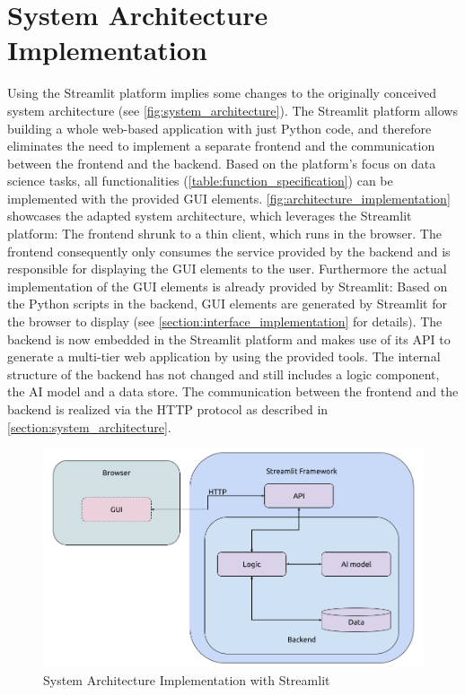 \documentclass[11pt,a4paper,english]{scrreprt}
\begin{document}
\section{System Architecture Implementation}
Using the Streamlit platform implies some changes to the originally conceived system architecture (see \autoref{fig:system_architecture}). The Streamlit platform allows building a whole web-based application with just Python code, and therefore eliminates the need to implement a separate frontend and the communication between the frontend and the backend. Based on the platform's focus on data science tasks, all functionalities (\autoref{table:function_specification}) can be implemented with the provided GUI elements. \autoref{fig:architecture_implementation} showcases the adapted system architecture, which leverages the Streamlit platform: The frontend shrunk to a thin client, which runs in the browser. The frontend consequently only consumes the service provided by the backend and is responsible for displaying the GUI elements to the user. Furthermore the actual implementation of the GUI elements is already provided by Streamlit: Based on the Python scripts in the backend, GUI elements are generated by Streamlit for the browser to display (see \autoref{section:interface_implementation} for details). The backend is now embedded in the Streamlit platform and makes use of its API to generate a multi-tier web application by using the provided tools. The internal structure of the backend has not changed and still includes a logic component, the AI model and a data store. The communication between the frontend and the backend is realized via the HTTP protocol as described in \autoref{section:system_architecture}.

\begin{figure}[htbp]
    \centering
    \includegraphics[width=\textwidth]{img/figures/architecture_implementation.png}
    \caption{System Architecture Implementation with Streamlit}
    \label{fig:architecture_implementation}
\end{figure}
\end{document}

